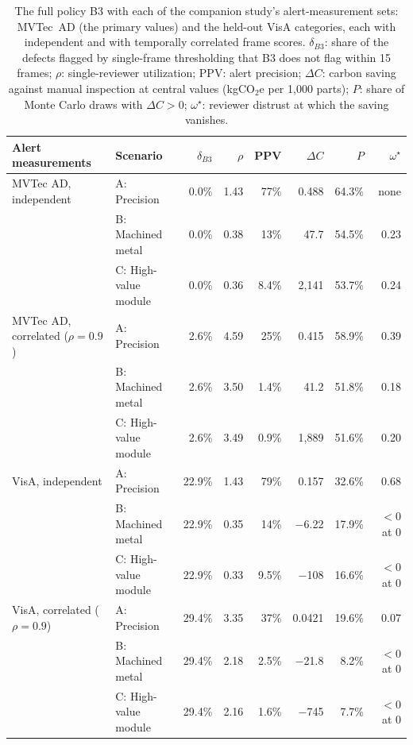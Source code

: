 \begin{table}[!t]
\centering
\footnotesize
\caption{The full policy B3 with each of the companion study's alert-measurement sets: MVTec~AD (the primary values) and the held-out VisA categories, each with independent and with temporally correlated frame scores. $\delta_{B3}$: share of the defects flagged by single-frame thresholding that B3 does not flag within 15 frames; $\rho$: single-reviewer utilization; PPV: alert precision; $\Delta C$: carbon saving against manual inspection at central values (kgCO$_2$e per 1{,}000 parts); $P$: share of Monte Carlo draws with $\Delta C>0$; $\omega^\star$: reviewer distrust at which the saving vanishes.}
\label{tab:alertsets}
\setlength{\tabcolsep}{4pt}
\begin{tabular}{@{}llrrrrrr@{}}
\toprule
Alert measurements & Scenario & $\delta_{B3}$ & $\rho$ & PPV & $\Delta C$ & $P$ & $\omega^\star$ \\
\midrule
MVTec AD, independent & A: Precision & 0.0\% & 1.43 & 77\% & 0.488 & 64.3\% & none \\
 & B: Machined metal & 0.0\% & 0.38 & 13\% & 47.7 & 54.5\% & 0.23 \\
 & C: High-value module & 0.0\% & 0.36 & 8.4\% & 2{,}141 & 53.7\% & 0.24 \\
\midrule
MVTec AD, correlated ($\rho=0.9$) & A: Precision & 2.6\% & 4.59 & 25\% & 0.415 & 58.9\% & 0.39 \\
 & B: Machined metal & 2.6\% & 3.50 & 1.4\% & 41.2 & 51.8\% & 0.18 \\
 & C: High-value module & 2.6\% & 3.49 & 0.9\% & 1{,}889 & 51.6\% & 0.20 \\
\midrule
VisA, independent & A: Precision & 22.9\% & 1.43 & 79\% & 0.157 & 32.6\% & 0.68 \\
 & B: Machined metal & 22.9\% & 0.35 & 14\% & $-$6.22 & 17.9\% & $<0$ at 0 \\
 & C: High-value module & 22.9\% & 0.33 & 9.5\% & $-$108 & 16.6\% & $<0$ at 0 \\
\midrule
VisA, correlated ($\rho=0.9$) & A: Precision & 29.4\% & 3.35 & 37\% & 0.0421 & 19.6\% & 0.07 \\
 & B: Machined metal & 29.4\% & 2.18 & 2.5\% & $-$21.8 & 8.2\% & $<0$ at 0 \\
 & C: High-value module & 29.4\% & 2.16 & 1.6\% & $-$745 & 7.7\% & $<0$ at 0 \\
\bottomrule
\end{tabular}
\end{table}

